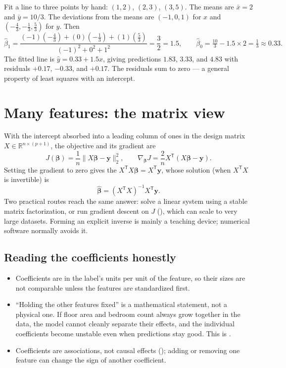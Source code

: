 \begin{workedexample}
Fit a line to three points by hand: $(1,2)$, $(2,3)$, $(3,5)$.
The means are $\bar{x}=2$ and $\bar{y}=10/3$. The deviations from the means are $(-1,0,1)$ for $x$ and $(-\tfrac{4}{3},-\tfrac{1}{3},\tfrac{5}{3})$ for $y$. Then
\[
  \hat{\beta}_1
  =\frac{(-1)(-\tfrac{4}{3})+(0)(-\tfrac{1}{3})+(1)(\tfrac{5}{3})}
        {{(-1)}^2+0^2+1^2}
  =\frac{3}{2}=1.5,
  \qquad
  \hat{\beta}_0=\tfrac{10}{3}-1.5\times 2=\tfrac{1}{3}\approx 0.33.
\]
The fitted line is $\hat{y}=0.33+1.5x$, giving predictions $1.83$, $3.33$, and $4.83$ with residuals $+0.17$, $-0.33$, and $+0.17$. The residuals sum to zero --- a general property of least squares with an intercept.
\end{workedexample}

\section{Many features: the matrix view}

With the intercept absorbed into a leading column of ones in the design matrix $X\in\mathbb{R}^{n\times(p+1)}$, the objective and its gradient are
\[
  J(\bm{\beta})=\frac{1}{n}\|X\bm{\beta}-\bm{y}\|_2^2,
  \qquad
  \nabla_{\bm{\beta}}J
  =\frac{2}{n}X^{\mathsf T}(X\bm{\beta}-\bm{y}).
\]
Setting the gradient to zero gives the  $X^{\mathsf T}X\bm{\beta}=X^{\mathsf T}\bm{y}$, whose solution (when $X^{\mathsf T}X$ is invertible) is
\[
  \hat{\bm{\beta}}={(X^{\mathsf T}X)}^{-1}X^{\mathsf T}\bm{y}.
\]
Two practical routes reach the same answer: solve a linear system using a stable matrix factorization, or run gradient descent on $J$ (), which can scale to very large datasets. Forming an explicit inverse is mainly a teaching device; numerical software normally avoids it.

\subsection{Reading the coefficients honestly}

\begin{itemize}
  \item Coefficients are in the label's units per unit of the feature, so their sizes are not comparable unless the features are standardized first.
  \item ``Holding the other features fixed'' is a mathematical statement, not a physical one. If floor area and bedroom count always grow together in the data, the model cannot cleanly separate their effects, and the individual coefficients become unstable even when predictions stay good. This is .
  \item Coefficients are associations, not causal effects (); adding or removing one feature can change the sign of another coefficient.
\end{itemize}

